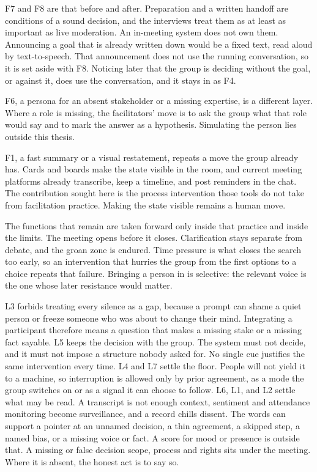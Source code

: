 F7 and F8 are that before and after.
Preparation and a written handoff are conditions of a sound decision, and the interviews
treat them as at least as important as live moderation.
An in-meeting system does not own them.
Announcing a goal that is already written down would be a fixed text, read aloud by
text-to-speech.
That announcement does not use the running conversation, so it is set aside with F8.
Noticing later that the group is deciding without the goal, or against it, does use the
conversation, and it stays in as F4.

F6, a persona for an absent stakeholder or a missing expertise, is a different layer.
Where a role is missing, the facilitators' move is to ask the group what that role would say
and to mark the answer as a hypothesis.
Simulating the person lies outside this thesis.

F1, a fast summary or a visual restatement, repeats a move the group already has.
Cards and boards make the state visible in the room, and current meeting platforms already
transcribe, keep a timeline, and post reminders in the chat.
The contribution sought here is the process intervention those tools do not take from
facilitation practice.
Making the state visible remains a human move.

The functions that remain are taken forward only inside that practice and inside the limits.
The meeting opens before it closes.
Clarification stays separate from debate, and the groan zone is endured.
Time pressure is what closes the search too early, so an intervention that hurries the group
from the first options to a choice repeats that failure.
Bringing a person in is selective: the relevant voice is the one whose later resistance would
matter.

L3 forbids treating every silence as a gap, because a prompt can shame a quiet person or
freeze someone who was about to change their mind.
Integrating a participant therefore means a question that makes a missing stake or a missing
fact sayable.
L5 keeps the decision with the group.
The system must not decide, and it must not impose a structure nobody asked for.
No single cue justifies the same intervention every time.
L4 and L7 settle the floor.
People will not yield it to a machine, so interruption is allowed only by prior agreement,
as a mode the group switches on or as a signal it can choose to follow.
L6, L1, and L2 settle what may be read.
A transcript is not enough context, sentiment and attendance monitoring become surveillance,
and a record chills dissent.
The words can support a pointer at an unnamed decision, a thin agreement, a skipped step, a
named bias, or a missing voice or fact.
A score for mood or presence is outside that.
A missing or false decision scope, process and rights sits under the meeting.
Where it is absent, the honest act is to say so.


